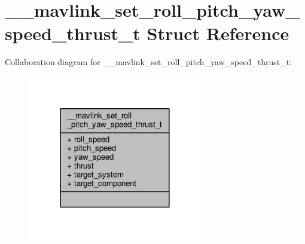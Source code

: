 \hypertarget{struct____mavlink__set__roll__pitch__yaw__speed__thrust__t}{\section{\+\_\+\+\_\+mavlink\+\_\+set\+\_\+roll\+\_\+pitch\+\_\+yaw\+\_\+speed\+\_\+thrust\+\_\+t Struct Reference}
\label{struct____mavlink__set__roll__pitch__yaw__speed__thrust__t}
}


Collaboration diagram for \+\_\+\+\_\+mavlink\+\_\+set\+\_\+roll\+\_\+pitch\+\_\+yaw\+\_\+speed\+\_\+thrust\+\_\+t\+:
\nopagebreak
\begin{figure}[H]
\begin{center}
\leavevmode
\includegraphics[width=216pt]{struct____mavlink__set__roll__pitch__yaw__speed__thrust__t__coll__graph}
\end{center}
\end{figure}
